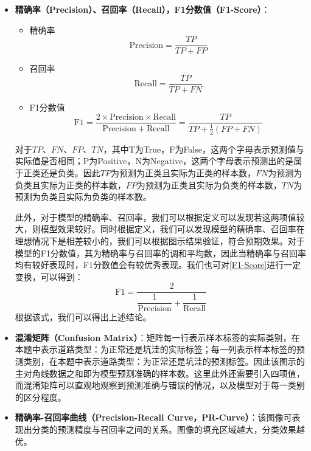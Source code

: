 \documentclass{MathorCupmodeling}
\begin{document}
\begin{itemize}
		\item \textbf{精确率（Precision）、召回率（Recall），F1分数值（F1-Score）}：
		\begin{itemize}
			\item {\heiti 精确率}
			\begin{equation}
				\mathrm{Precision} = \frac{TP}{TP+FP} \label{Precision}
			\end{equation}
			\item {\heiti 召回率}
			\begin{equation}
				\mathrm{Recall} = \frac{TP}{TP+FN} \label{Recall}
			\end{equation}
			\item {\heiti F1分数值} 
			\begin{equation}
				\mathrm{F}1 = \frac{2\times \mathrm{Precision}\times \mathrm{Recall}}{\mathrm{Precision}+\mathrm{Recall}}=\frac{TP}{TP+\frac{1}{2}\left(FP+FN\right)} \label{F1-Score}
			\end{equation}
		\end{itemize}
		对于$TP$、$FN$、$FP$、$TN$，其中T为True，F为False，这两个字母表示预测值与实际值是否相同；P为Positive，N为Negative，这两个字母表示预测出的是属于正类还是负类。因此$TP$为预测为正类且实际为正类的样本数，$FN$为预测为负类且实际为正类的样本数，$FP$为预测为正类且实际为负类的样本数，$TN$为预测为负类且实际为负类的样本数。

		此外，对于模型的精确率、召回率，我们可以根据定义可以发现若这两项值较大，则模型效果较好。同时根据定义，我们可以发现模型的精确率、召回率在理想情况下是相差较小的，我们可以根据图示结果验证，符合预期效果。对于模型的F1分数值，其为精确率与召回率的调和平均数\textcolor{blue}{\cite{模型评测}}，因此当精确率与召回率均有较好表现时，F1分数值会有较优秀表现。我们也可对\textcolor{blue}{\eqref{F1-Score}}进行一定变换，可以得到：
		\begin{equation}
			\mathrm{F}1=\frac{2}{\dfrac{1}{\mathrm{Precision}}+\dfrac{1}{\mathrm{Recall}}} \label{ReacllNew}
		\end{equation}
		根据该式，我们可以得出上述结论。

		\item \textbf{混淆矩阵（Confusion Matrix）}：矩阵每一行表示样本标签的实际类别，在本题中表示道路类型：为正常还是坑洼的实际标签；每一列表示样本标签的预测类别，在本题中表示道路类型：为正常还是坑洼的预测标签。因此该图示的主对角线数据之和即为模型预测准确的样本数。这里此外还需要引入四项值，而混淆矩阵可以直观地观察到预测准确与错误的情况，以及模型对于每一类别的区分程度。
		\item \textbf{精确率-召回率曲线（Precision-Recall Curve，PR-Curve）}：该图像可表现出分类的预测精度与召回率之间的关系\textcolor{blue}{\cite{Yellowbrick}}。图像的填充区域越大，分类效果越优。
	\end{itemize}
\end{document}
